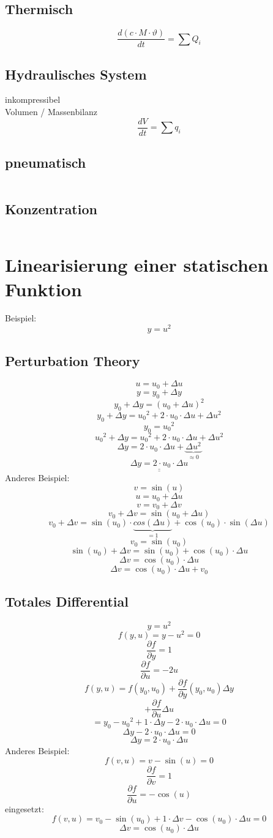 \subsection{Thermisch}
\[ \boxed{\frac{d(c \cdot M \cdot \vartheta)}{dt} = \sum Q_i} \]

\subsection{Hydraulisches System}
inkompressibel \\
Volumen / Massenbilanz
\[ \boxed{\frac{dV}{dt} = \sum q_i} \]

\subsection{pneumatisch}
\[ \boxed{} \]

\subsection{Konzentration}
\[ \boxed{} \]

\section{Linearisierung einer statischen Funktion}
Beispiel: 
\[ y = u^2 \]

\subsection{Perturbation Theory}
\[ u = u_0 + \Delta u \]
\[ y = y_0 + \Delta y \]
\[ y_0 + \Delta y = (u_0 + \Delta u)^2 \]
\[ y_0 + \Delta y = {u_0}^2 + 2 \cdot u_0 \cdot \Delta u + \Delta u ^2 \]
\[ y_0 = {u_0}^2 \]
\[ {u_0}^2 + \Delta y = {u_0}^2 + 2 \cdot u_0 \cdot \Delta u + \Delta u^2 \]
\[ \Delta y = 2 \cdot u_0 \cdot \Delta u + \underbrace{\Delta u^2}_{\approx 0} \]
\[ \underline{\underline{\Delta y = 2 \cdot u_0 \cdot \Delta u}} \]
%
Anderes Beispiel: 
\[ v = \sin(u) \]
\[ u = u_0 + \Delta u \]
\[ v = v_0 + \Delta v \]
\[ v_0 + \Delta v = \sin(u_0 + \Delta u) \]
\[ v_0 + \Delta v = \sin(u_0) \cdot \underbrace{cos(\Delta u)}_{=1} 
+ \cos(u_0) \cdot \sin(\Delta u) \]
\[ v_0 = \sin(u_0) \]
\[ \sin(u_0) + \Delta v = \sin(u_0) + \cos(u_0) \cdot \Delta u \]
\[ \Delta v = \cos(u_0) \cdot \Delta u \]
\[ \Delta v = \cos(u_0) \cdot \Delta u + v_0 \]

\subsection{Totales Differential}
\[ y = u^2 \]
\[ f(y, u) = y - u^2 = 0 \]
\[ \frac{\partial f}{\partial y} = 1 \]
\[ \frac{\partial f}{\partial u} = -2u \]
\[ f(y, u) = f(y_0, u_0) + \frac{\partial f}{\partial y}(y_0, u_0) \Delta y \]
\[ + \frac{\partial f}{\partial u} \Delta u \]
\[ = y_0 - {u_0}^2 + 1 \cdot \Delta y - 2 \cdot u_0 \cdot \Delta u = 0 \]
\[ \Delta y - 2 \cdot u_0 \cdot \Delta u = 0 \]
\[ \Delta y = 2 \cdot u_0 \cdot \Delta u \]
%
Anderes Beispiel: 
\[ f(v, u) = v - \sin(u) = 0 \]
\[ \frac{\partial f}{\partial v} = 1 \]
\[ \frac{\partial f}{\partial u} = - \cos(u) \]
eingesetzt: 
\[ f(v, u) = v_0 - \sin(u_0) + 1 \cdot \Delta v - \cos(u_0) \cdot \Delta u = 0 \]
\[ \Delta v = \cos(u_0) \cdot \Delta u \]

